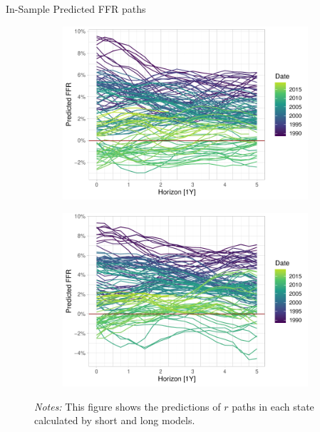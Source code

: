 \documentclass[10pt,aspectratio=169]{beamer}
\begin{document}
\begin{frame}{In-Sample Predicted FFR paths}
    \begin{figure}[!htbp]\centering
        \begin{minipage}{\textwidth}
            \caption{}
            \label{fig:predicted_paths}
            \begin{subfigure}[b]{0.49\textwidth}
                \includegraphics[width=\linewidth]{predicted_ffr_paths_short.pdf}
            \end{subfigure}%
            \begin{subfigure}[b]{0.49\textwidth}
          \includegraphics[width=\linewidth]{predicted_ffr_paths_long.pdf}
        \end{subfigure}
          {\begin{flushleft}\tiny \textit{Notes:} This figure shows the predictions of $r$ paths in each state calculated by short and long models.\end{flushleft}} 
          \end{minipage}
      \end{figure}
\end{frame}
\end{document}
